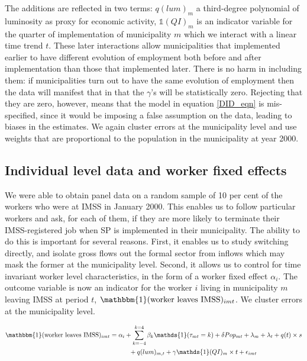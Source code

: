 \documentclass[oneside,11pt]{article}
\begin{document}
\noindent The additions are reflected in two terms: $q(lum)_m$ a third-degree polynomial of luminosity as proxy for economic activity, $\mathds{1}(QI)_m$ is an indicator variable for the quarter of implementation of municipality $m$ which we interact with a linear time trend $t$. These later interactions allow municipalities that implemented earlier to have different evolution of employment both before and after implementation than those that implemented later. There is no harm in including them: if municipalities turn out to have the same evolution of employment then the data will manifest that in that the $\gamma$'s will be statistically zero.  Rejecting that they are zero, however, means that the model in equation \ref{DID_eqn} is mis-specified, since it would be imposing a false assumption on the data, leading to biases in the estimates. We again cluster errors at the municipality level and use weights that are proportional to the population in the municipality
at year 2000.


\subsection{Individual level data and worker fixed effects}

We were able to obtain panel data on a random sample of 10 per cent of the workers who were at IMSS in January 2000. This enables us to follow particular workers and ask, for each of them, if they are more likely to terminate their IMSS-registered job when SP is implemented in their municipality. The ability to do this is important for several reasons. First, it enables us to study switching directly, and isolate gross flows out the formal sector from inflows which may mask the former at the municipality level. Second, it allows us to control for time invariant worker level characteristics, in the form of a worker fixed effect $\alpha_i$. The outcome variable is now an indicator for the worker $i$ living in municipality $m$ leaving IMSS at period $t$, $\mathbbm{1}(\text{worker leaves IMSS})_{imt}$. We cluster errors at the municipality level.

\begin{align} \label{eq_DID_individual}
  \mathbbm{1}(\text{worker leaves IMSS})_{imt}&=\alpha_i + \sum_{k=-4}^{k=4}\beta_{k}\mathds{1}(\tau_{mt}=k)+\delta Pop_{mt} + \lambda_m + \lambda_t + q(t)\times s \nonumber \\ 
  &\quad\quad\quad+q(lum)_{m,t} + \gamma \mathds{1}(QI)_m \times t  + \epsilon_{imt}
\end{align}
\end{document}
